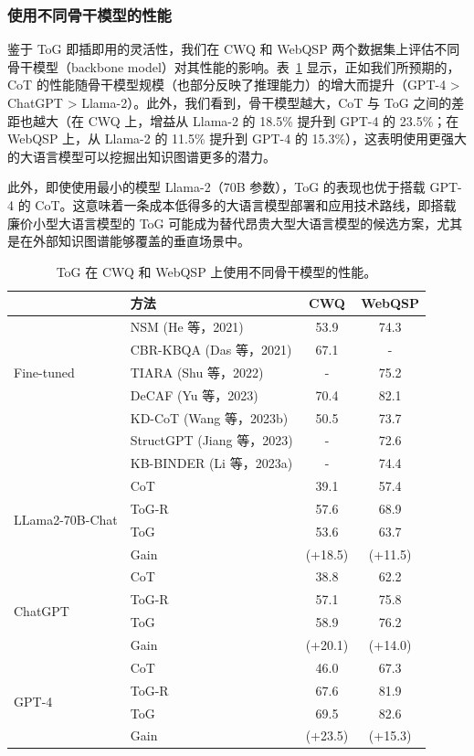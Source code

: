 \documentclass[11pt,UTF8,fontset=fandol]{ctexart}
\begin{document}
\subsubsection{使用不同骨干模型的性能}

鉴于 ToG 即插即用的灵活性，我们在 CWQ 和 WebQSP 两个数据集上评估不同骨干模型（backbone model）对其性能的影响。表~\ref{tab:2} 显示，正如我们所预期的，CoT 的性能随骨干模型规模（也部分反映了推理能力）的增大而提升（GPT-4 > ChatGPT > Llama-2）。此外，我们看到，骨干模型越大，CoT 与 ToG 之间的差距也越大（在 CWQ 上，增益从 Llama-2 的 18.5\% 提升到 GPT-4 的 23.5\%；在 WebQSP 上，从 Llama-2 的 11.5\% 提升到 GPT-4 的 15.3\%），这表明使用更强大的大语言模型可以挖掘出知识图谱更多的潜力。

此外，即使使用最小的模型 Llama-2（70B 参数），ToG 的表现也优于搭载 GPT-4 的 CoT。这意味着一条成本低得多的大语言模型部署和应用技术路线，即搭载廉价小型大语言模型的 ToG 可能成为替代昂贵大型大语言模型的候选方案，尤其是在外部知识图谱能够覆盖的垂直场景中。

\begin{table}[H]\centering
\caption{ToG 在 CWQ 和 WebQSP 上使用不同骨干模型的性能。}
\label{tab:2}
\small
\begin{tabular}{llcc}
\toprule
& 方法 & CWQ & WebQSP \\
\midrule
\multirow{5}{*}{Fine-tuned} & NSM (He 等，2021) & 53.9 & 74.3 \\
& CBR-KBQA (Das 等，2021) & 67.1 & - \\
& TIARA (Shu 等，2022) & - & 75.2 \\
& DeCAF (Yu 等，2023) & 70.4 & 82.1 \\
\midrule
\multirow{3}{*}{Prompting} & KD-CoT (Wang 等，2023b) & 50.5 & 73.7 \\
& StructGPT (Jiang 等，2023) & - & 72.6 \\
& KB-BINDER (Li 等，2023a) & - & 74.4 \\
\midrule
\multirow{4}{*}{LLama2-70B-Chat} & CoT & 39.1 & 57.4 \\
& ToG-R & 57.6 & 68.9 \\
& ToG & 53.6 & 63.7 \\
& Gain & (+18.5) & (+11.5) \\
\midrule
\multirow{4}{*}{ChatGPT} & CoT & 38.8 & 62.2 \\
& ToG-R & 57.1 & 75.8 \\
& ToG & 58.9 & 76.2 \\
& Gain & (+20.1) & (+14.0) \\
\midrule
\multirow{4}{*}{GPT-4} & CoT & 46.0 & 67.3 \\
& ToG-R & 67.6 & 81.9 \\
& ToG & 69.5 & 82.6 \\
& Gain & (+23.5) & (+15.3) \\
\bottomrule
\end{tabular}
\end{table}
\end{document}
